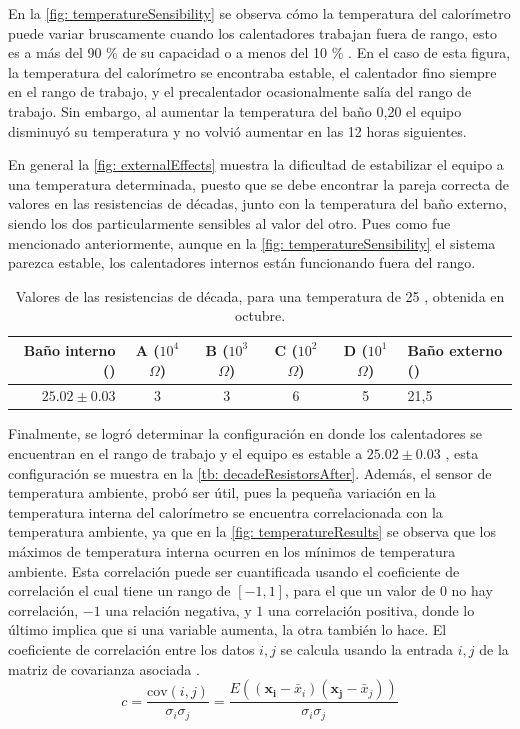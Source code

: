 	\newpage

	En la \autoref{fig: temperatureSensibility} se observa cómo la temperatura del calorímetro puede variar bruscamente cuando los calentadores trabajan fuera de rango, esto es a m\'as del 90 \% de su capacidad o a menos del 10 \% \cite{Suurkuusk}. En el caso de esta figura, la temperatura del calorímetro se encontraba estable, el calentador fino siempre en el rango de trabajo, y el precalentador ocasionalmente salía del rango de trabajo. Sin embargo, al aumentar la temperatura del baño 0,20 \grad{} el equipo disminuyó su temperatura y no volvió aumentar en las 12 horas siguientes. 
	
	En general la \autoref{fig: externalEffects} muestra la dificultad de estabilizar el equipo a una temperatura determinada, puesto que se debe encontrar la pareja correcta de valores en las resistencias de décadas, junto con la temperatura del baño externo, siendo los dos particularmente sensibles al valor del otro. Pues como fue mencionado anteriormente, aunque en la \autoref{fig: temperatureSensibility} el sistema parezca estable, los calentadores internos están funcionando fuera del rango.
	\begin{table}[h]
		\centering
		\caption{Valores de las resistencias de década, para una temperatura de 25 \grad{}, obtenida en octubre.}
		\begin{tabular}{r|cccc|l}
			\hline
			\textbf{Baño interno (\grad{})} & A ($10^4$ $\Omega$) & B ($10^3$ $\Omega$) & C ($10^2$ $\Omega$) & D ($10^1$ $\Omega$) & \textbf{Baño externo (\grad{})} \\
			\hline
			$25.02 \pm 0.03$ & 3 & 3 & 6 & 5 & 21,5 \\
			\hline
		\end{tabular}
		\label{tb: decadeResistorsAfter}
	\end{table}

	Finalmente, se logró determinar la configuración en donde los calentadores se encuentran en el rango de trabajo y el equipo es estable a $25.02 \pm 0.03$ \grad{}, esta configuración se muestra en la \autoref{tb: decadeResistorsAfter}. Además, el sensor de temperatura ambiente, probó ser útil, pues la pequeña variación en la temperatura interna del calorímetro se encuentra correlacionada con la temperatura ambiente, ya que en la \autoref{fig: temperatureResults} se observa que los máximos de temperatura interna ocurren en los mínimos de temperatura ambiente. Esta correlaci\'on puede ser cuantificada usando el coeficiente de correlaci\'on el cual tiene un rango de $[-1, 1]$, para el que un valor de $0$ no hay correlaci\'on, $-1$ una relaci\'on negativa, y $1$ una correlaci\'on positiva, donde lo \'ultimo implica que si una variable aumenta, la otra tambi\'en lo hace. El coeficiente de correlaci\'on entre los datos $i, j$ se calcula usando la entrada $i,j$ de la matriz de covarianza asociada \cite{landau2008survey}.
	\begin{equation}
		c = \dfrac{\text{cov}(i, j)}{\sigma_i\sigma_j} = \dfrac{E((\mathbf{x_i} - \bar{x}_i)(\mathbf{x_j} - \bar{x}_j))}{\sigma_i\sigma_j}
	\end{equation}
	\newpage

